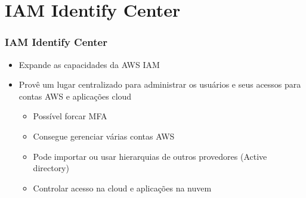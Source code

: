 \section{IAM Identify Center}

\begin{frame}
	\frametitle{IAM Identify Center}
	\begin{itemize}
		\item Expande as capacidades da AWS IAM
		\item Provê um lugar centralizado para administrar os usuários e seus acessos para contas AWS e aplicações cloud
			\begin{itemize}
				\item Possível forcar MFA
				\item Consegue gerenciar várias contas AWS
				\item Pode importar ou usar hierarquias de outros provedores (Active directory)
				\item Controlar acesso na cloud e aplicações na nuvem
			\end{itemize}
	\end{itemize}
\end{frame}


